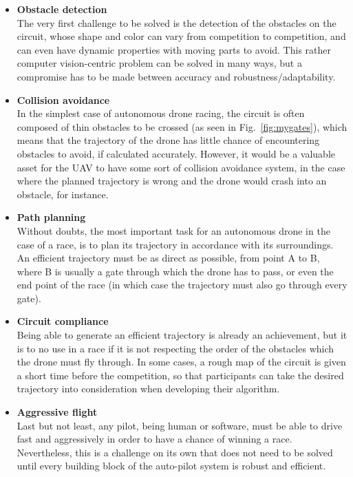 \begin{itemize}
	\item{\textbf{Obstacle detection\\}
		The very first challenge to be solved is the detection of the obstacles
		on the circuit, whose shape and color can vary from competition to
		competition, and can even have dynamic properties with moving parts to
		avoid. This rather computer vision-centric problem can be solved
		in many ways, but a compromise has to be made between accuracy and
		robustness/adaptability.
	}
	\item{\textbf{Collision avoidance\\}
		In the simplest case of autonomous drone racing, the circuit is often
		composed of thin obstacles to be crossed (as seen in
		Fig.~\ref{fig:mygates}), which means that the trajectory of the drone
		has little chance of encountering obstacles to avoid, if calculated
		accurately. However, it would be a valuable asset for the UAV to have
		some sort of collision avoidance system, in the case where the planned
		trajectory is wrong and the drone would crash into an obstacle, for
		instance.
	}
	\item{\textbf{Path planning\\}
		Without doubts, the most important task for an autonomous drone in the
		case of a race, is to plan its trajectory in accordance with its
		surroundings. An efficient trajectory must be as direct as possible,
		from point A to B, where B is usually a gate through which the drone
		has to pass, or even the end point of the race (in which case the
		trajectory must also go through every gate).
	}
	\item{\textbf{Circuit compliance\\}
		Being able to generate an efficient trajectory is already an
		achievement, but it is to no use in a race if it is not respecting the
		order of the obstacles which the drone must fly through. In some cases,
		a rough map of the circuit is given a short time before the
		competition, so that participants can take the desired trajectory into
		consideration when developing their algorithm.
	}
	\item{\textbf{Aggressive flight\\}
		Last but not least, any pilot, being human or software, must be able to
		drive fast and aggressively in order to have a chance of winning a
		race.  Nevertheless, this is a challenge on its own that does not need
		to be solved until every building block of the auto-pilot system is
		robust and efficient.\\
	}
\end{itemize}

